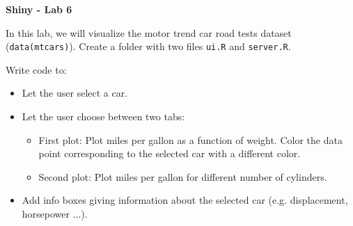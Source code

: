 \documentclass[letterpaper, 12pt]{article}
\begin{document}
\begin{center}
\textbf{\Large{Shiny - Lab 6}}
\end{center}

\vspace{2em}

In this lab, we will visualize the motor trend car road tests dataset (\verb|data(mtcars)|). Create a folder with two files \verb|ui.R| and \verb|server.R|.

\vspace{1em}

Write code to:
\begin{itemize}
	\item Let the user select a car.
	\item Let the user choose between two tabs:
	\begin{itemize}
		\item First plot: Plot miles per gallon as a function of weight. Color the data point corresponding to the selected car with a different color.
		\item Second plot: Plot miles per gallon for different number of cylinders.
	\end{itemize}
	\item Add info boxes giving information about the selected car (e.g. displacement, horsepower ...).
\end{itemize}

\vspace{1em}
 
\end{document}
